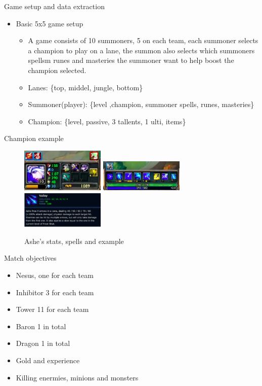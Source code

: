 \begin{frame}{Game setup and data extraction}
\begin{itemize}
\item Basic 5x5 game setup
\begin{itemize}
\item A game consists of 10 summoners, 5 on each team, each summoner selects a champion to play on a lane, the summon also selects which summoners spellsm runes and masteries the summoner want to help boost the champion selected.   
\item Lanes: \{top, middel, jungle, bottom\}
\item Summoner(player): \{level ,champion, summoner spells, runes, masteries\}
\item Champion: \{level, passive, 3 tallents, 1 ulti, items\}
\end{itemize}
\end{itemize}
\vspace{20cm}
\end{frame}
\begin{frame}{Champion example}
\begin{figure}[h!]
\centering
\includegraphics[width=4cm]{leagueoflegends/ashe1}
\includegraphics[width=4cm]{leagueoflegends/ashe2}
\includegraphics[width=4cm]{leagueoflegends/volly}
\caption{Ashe's stats, spells and example}
\end{figure}
\end{frame}
\begin{frame}{Match objectives}
\begin{itemize}
\item Nesus, one for each team 
\item Inhibitor 3 for each team 
\item Tower 11 for each team 
\item Baron 1 in total
\item Dragon 1 in total
\item Gold and experience
\item Killing enermies, minions and monsters 
\end{itemize}
\end{frame}
